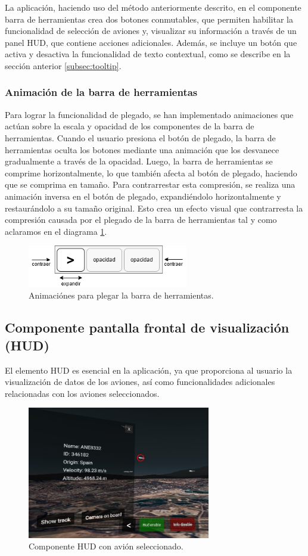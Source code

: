 \documentclass[a4paper, 11pt]{book}
\begin{document}
La aplicación, haciendo uso del método anteriormente descrito, en el componente barra de herramientas crea dos botones conmutables, que permiten habilitar la funcionalidad de selección de aviones y, visualizar su información a través de un panel \textsc{\gls{HUD}}, que contiene acciones adicionales. Además, se incluye un botón que activa y desactiva la funcionalidad de texto contextual, como se describe en la sección anterior \ref{subsec:tooltip}.
\subsubsection{Animación de la barra de herramientas}
\label{subsec:animationToolbar}
Para lograr la funcionalidad de plegado, se han implementado animaciones que actúan sobre la escala y opacidad de los componentes de la barra de herramientas. Cuando el usuario presiona el botón de plegado, la barra de herramientas oculta los botones mediante una animación que los desvanece gradualmente a través de la opacidad. Luego, la barra de herramientas se comprime horizontalmente, lo que también afecta al botón de plegado, haciendo que se comprima en tamaño.
Para contrarrestar esta compresión, se realiza una animación inversa en el botón de plegado, expandiéndolo horizontalmente y restaurándolo a su tamaño original. Esto crea un efecto visual que contrarresta la compresión causada por el plegado de la barra de herramientas tal y como aclaramos en el diagrama \ref{fig:animationPlegado}.
\begin{figure}[h]
  \centering
  \includegraphics[width=7cm, keepaspectratio]{img/plegadoToolbar.drawio.png}
  \caption{Animaciónes para plegar la barra de herramientas.}
  \label{fig:animationPlegado}
\end{figure}
\subsection{Componente pantalla frontal de visualización (HUD)}
\label{subsec:hud}
El elemento \textsc{\gls{HUD}} es esencial en la aplicación, ya que proporciona al usuario la visualización de datos de los aviones, así como funcionalidades adicionales relacionadas con los aviones seleccionados.
\begin{figure}[h]
  \centering
  \includegraphics[width=8cm, keepaspectratio]{img/hud.jpg}
  \caption{Componente \textsc{HUD} con avión seleccionado.}
  \label{fig:hud}
\end{figure}
\end{document}
